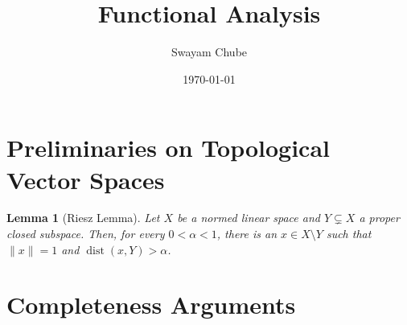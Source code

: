 \documentclass[12pt]{article}
\title{Functional Analysis}
\author{Swayam Chube}
\date{\today}
\theoremstyle{thmstyle}
\newtheorem{lemma}[theorem]{Lemma}
\theoremstyle{defstyle}
\begin{document}
\maketitle
\tableofcontents

\newpage

\section{Preliminaries on Topological Vector Spaces}

\begin{lemma}[Riesz Lemma]
    Let $X$ be a normed linear space and $Y\subsetneq X$ a proper closed subspace. Then, for every $0 < \alpha < 1$, there is an $x\in X\setminus Y$ such that $\|x\| = 1$ and $\operatorname{dist}(x, Y) > \alpha$.
\end{lemma}

\section{Completeness Arguments}
\end{document}
